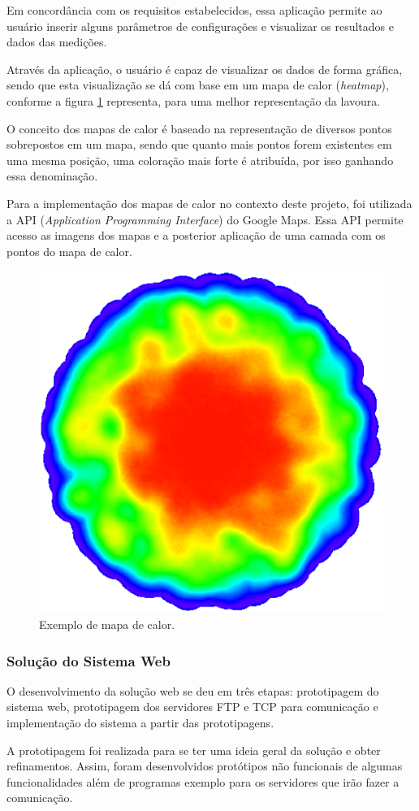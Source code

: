   Em concordância com os requisitos estabelecidos, essa aplicação
  permite ao usuário inserir alguns parâmetros de configurações e visualizar
  os resultados e dados das medições.

  Através da aplicação, o usuário é capaz de visualizar os dados de forma gráfica,
  sendo que esta visualização se dá com base em um mapa de calor (\textit{heatmap}), conforme a figura \ref{fig:heatmap} representa,
	para uma melhor representação da lavoura.

  O conceito dos mapas de calor é baseado na representação de diversos pontos sobrepostos em um mapa, sendo que quanto mais pontos
  forem existentes em uma mesma posição, uma coloração mais forte é atribuída, por isso ganhando essa denominação.

  Para a implementação dos mapas de calor no contexto deste projeto, foi utilizada a API (\textit{Application Programming Interface})
  do Google Maps. Essa API permite acesso as imagens dos mapas e a posterior aplicação de uma camada com os pontos do mapa de calor.

  \begin{figure}[!htbp]
  \begin{center}
  \includegraphics[width=.5\textwidth]{figuras/heatmap.eps}
  \caption{\label{fig:heatmap}Exemplo de mapa de calor.}
  \end{center}
  \end{figure}

  \subsubsection{Solução do Sistema Web}
  O desenvolvimento da solução web se deu em três etapas: prototipagem do sistema web,
  prototipagem dos servidores FTP e TCP para comunicação e implementação do sistema
  a partir das prototipagens.

  A prototipagem foi realizada para se ter uma ideia geral da solução e obter
  refinamentos. Assim, foram desenvolvidos protótipos não funcionais de algumas funcionalidades
  além de programas exemplo para os servidores que irão fazer a comunicação.

